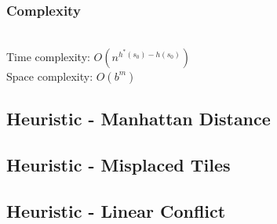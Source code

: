 \documentclass{llncs}
\begin{document}
\subsubsection{Complexity}\hfill\\
Time complexity: $O(n^{h^*(s_0)-h(s_0)})$\\
Space complexity: $O(b^m)$

\subsection{Heuristic - Manhattan Distance}
\subsection{Heuristic - Misplaced Tiles}
\subsection{Heuristic - Linear Conflict}
\end{document}
